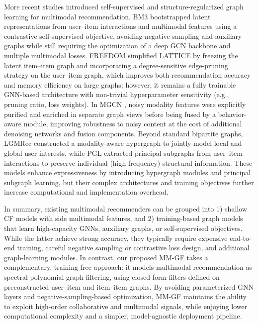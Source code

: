 \documentclass[a4paper,fleqn]{cas-sc}
\renewcommand{\cite}{\citep}
\begin{document}
More recent studies introduced self-supervised and structure-regularized graph learning for multimodal recommendation. BM3 \cite{DBLP:conf/www/ZhouZLZMWYJ23} bootstrapped latent representations from user--item interactions and multimodal features using a contrastive self-supervised objective, avoiding negative sampling and auxiliary graphs while still requiring the optimization of a deep GCN backbone and multiple multimodal losses. FREEDOM \cite{DBLP:conf/mm/ZhouS23} simplified LATTICE by freezing the latent item--item graph and incorporating a degree-sensitive edge-pruning strategy on the user--item graph, which improves both recommendation accuracy and memory efficiency on large graphs; however, it remains a fully trainable GNN-based architecture with non-trivial hyperparameter sensitivity (e.g., pruning ratio, loss weights). In MGCN \cite{DBLP:conf/mm/Yu0LB23}, noisy modality features were explicitly purified and enriched in separate graph views before being fused by a behavior-aware module, improving robustness to noisy content at the cost of additional denoising networks and fusion components. Beyond standard bipartite graphs, LGMRec \cite{DBLP:conf/aaai/GuoL0WSR24} constructed a modality-aware hypergraph to jointly model local and global user interests, while PGL \cite{DBLP:conf/aaai/Yu0LB25} extracted principal subgraphs from user--item interactions to preserve individual (high-frequency) structural information. These models enhance expressiveness by introducing hypergraph modules and principal subgraph learning, but their complex architectures and training objectives further increase computational and implementation overhead.

In summary, existing multimodal recommenders can be grouped into 1) shallow CF models with side multimodal features, and 2) training-based graph models that learn high-capacity GNNs, auxiliary graphs, or self-supervised objectives. While the latter achieve strong accuracy, they typically require expensive end-to-end training, careful negative sampling or contrastive loss design, and additional graph-learning modules. In contrast, our proposed \textsf{MM-GF} takes a complementary, training-free approach: it models multimodal recommendation as spectral polynomial graph filtering, using closed-form filters defined on preconstructed user--item and item--item graphs. By avoiding parameterized GNN layers and negative-sampling-based optimization, \textsf{MM-GF} maintains the ability to exploit high-order collaborative and multimodal signals, while enjoying lower computational complexity and a simpler, model-agnostic deployment pipeline.
\end{document}
